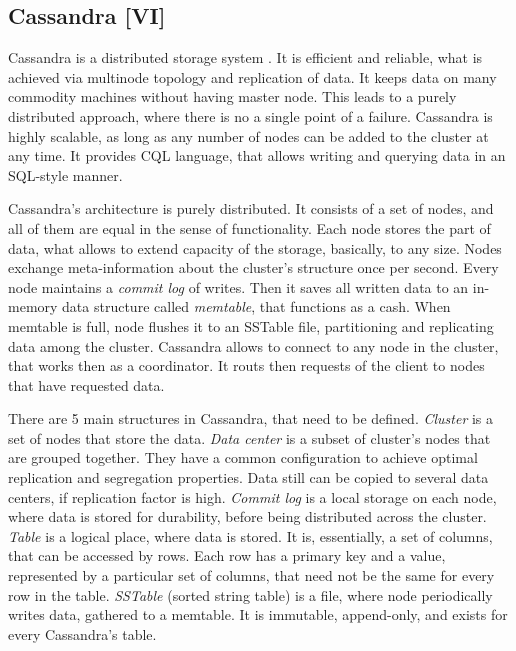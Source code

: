 \subsection{Cassandra [VI]}
\label{subs:cassandra}

Cassandra is a distributed storage system \cite{Cassandra, Avinash2014, Hewitt2011}.
It is efficient and reliable, what is achieved via multinode topology and replication of data.
It keeps data on many commodity machines without having master node.
This leads to a purely distributed approach, where there is no a single point of a failure.
Cassandra is highly scalable, as long as any number of nodes can be added to the cluster at any time.
It provides CQL language, that allows writing and querying data in an SQL-style manner.

Cassandra's architecture is purely distributed.
It consists of a set of nodes, and all of them are equal in the sense of functionality.
Each node stores the part of data, what allows to extend capacity of the storage, basically, to any size.
Nodes exchange meta-information about the cluster's structure once per second.
Every node maintains a \textit{commit log} of writes.
Then it saves all written data to an in-memory data structure called \textit{memtable}, that functions as a cash.
When memtable is full, node flushes it to an SSTable file, partitioning and replicating data among the cluster.
Cassandra allows to connect to any node in the cluster, that works then as a coordinator.
It routs then requests of the client to nodes that have requested data.

There are 5 main structures in Cassandra, that need to be defined.
\textit{Cluster} is a set of nodes that store the data.
\textit{Data center} is a subset of cluster's nodes that are grouped together.
They have a common configuration to achieve optimal replication and segregation properties.
Data still can be copied to several data centers, if replication factor is high.
\textit{Commit log} is a local storage on each node, where data is stored for durability, before being distributed across the cluster.
\textit{Table} is a logical place, where data is stored.
It is, essentially, a set of columns, that can be accessed by rows.
Each row has a primary key and a value, represented by a particular set of columns, that need not be the same for every row in the table.
\textit{SSTable} (sorted string table) is a file, where node periodically writes data, gathered to a memtable.
It is immutable, append-only, and exists for every Cassandra's table.

